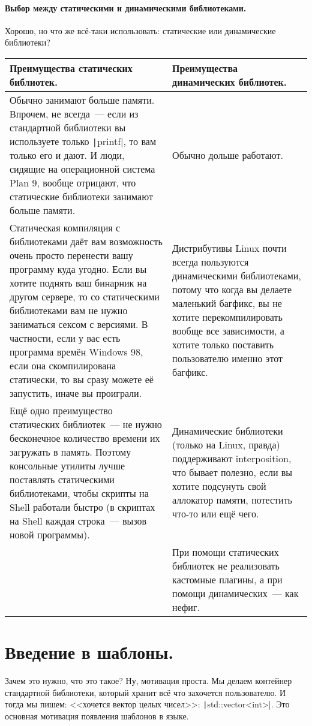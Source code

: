 \documentclass{article}
\begin{document}
    \paragraph{Выбор между статическими и динамическими библиотеками.}
    Хорошо, но что же всё-таки использовать: статические или динамические библиотеки?    \begin{center}
        \begin{tabular}{|m{}|m{}|}
            \hline
            Преимущества статических библиотек. & Преимущества динамических библиотек.\\
            \hline
            Обычно занимают больше памяти. Впрочем, не всегда~--- если из стандартной библиотеки вы используете только \texttt|printf|, то вам только его и дают. И люди, сидящие на операционной система Plan 9, вообще отрицают, что статические библиотеки занимают больше памяти. & Обычно дольше работают.\\
            \hline
            Статическая компиляция с библиотеками даёт вам возможность очень просто перенести вашу программу куда угодно. Если вы хотите поднять ваш бинарник на другом сервере, то со статическими библиотеками вам не нужно заниматься сексом с версиями. В частности, если у вас есть программа времён Windows 98, если она скомпилирована статически, то вы сразу можете её запустить, иначе вы проиграли. & Дистрибутивы Linux почти всегда пользуются динамическими библиотеками, потому что когда вы делаете маленький багфикс, вы не хотите перекомпилировать вообще все зависимости, а хотите только поставить пользователю именно этот багфикс.\\
            \hline
            Ещё одно преимущество статических библиотек~--- не нужно бесконечное количество времени их загружать в память. Поэтому консольные утилиты лучше поставлять статическими библиотеками, чтобы скрипты на Shell работали быстро (в скриптах на Shell каждая строка~--- вызов новой программы). & Динамические библиотеки (только на Linux, правда) поддерживают interposition, что бывает полезно, если вы хотите подсунуть свой аллокатор памяти, потестить что-то или ещё чего.\\
            \hline
            & При помощи статических библиотек не реализовать кастомные плагины, а при помощи динамических~--- как нефиг.\\
            \hline
        \end{tabular}
    \end{center}
    \section{Введение в шаблоны.}
    Зачем это нужно, что это такое? Ну, мотивация проста. Мы делаем контейнер стандартной библиотеки, который хранит всё что захочется пользователю. И тогда мы пишем: <<хочется вектор целых чисел>>: \texttt|std::vector<int>|. Это основная мотивация появления шаблонов в языке.
\end{document}
